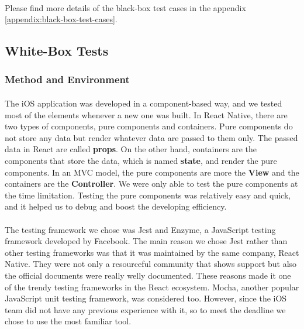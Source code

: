 \documentclass[12pt,a4paper]{article}
\begin{document}
          \paragraph{} Please find more details of the black-box test cases in the appendix \ref{appendix:black-box-test-cases}.

      \subsection{White-Box Tests}
        \subsubsection{Method and Environment} %
          \paragraph{}The iOS application was developed in a component-based way, and we tested most of the elements whenever a new one was built. In React Native, there are two types of components, pure components and containers. Pure components do not store any data but render whatever data are passed to them only. The passed data in React are called {\bf props}. On the other hand, containers are the components that store the data, which is named {\bf state}, and render the pure components. In an MVC model, the pure components are more the {\bf View} and the containers are the {\bf Controller}. We were only able to test the pure components at the time limitation. Testing the pure components was relatively easy and quick, and it helped us to debug and boost the developing efficiency.
          
          \paragraph{}The testing framework we chose was Jest\cite{Jest} and Enzyme\cite{Enzyme}, a JavaScript testing framework developed by Facebook. The main reason we chose Jest rather than other testing frameworks was that it was maintained by the same company, React Native. They were not only a resourceful community that shows support but also the official documents were really welly documented. These reasons made it one of the trendy testing frameworks in the React ecosystem. Mocha, another popular JavaScript unit testing framework, was considered too. However, since the iOS team did not have any previous experience with it, so to meet the deadline we chose to use the most familiar tool.
        
\end{document}
